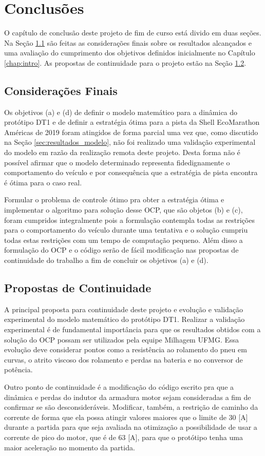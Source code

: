 \chapter{Conclusões}
\label{chap:conclusao}

O capítulo de conclusão deste projeto de fim de curso está divido em duas seções.
Na Seção \ref{sec:5_1} são feitas as considerações finais sobre os resultados alcançados e uma avaliação do cumprimento dos objetivos definidos inicialmente no Capítulo \ref{chap:intro}.
As propostas de continuidade para o projeto estão na Seção \ref{sec:5_2}.

\section{Considerações Finais}
\label{sec:5_1}

Os objetivos (a) e (d) de definir o modelo matemático para a dinâmica do protótipo DT1 e de definir a estratégia ótima para a pista da Shell EcoMarathon Américas de 2019 
foram atingidos de forma parcial uma vez que, como discutido na Seção \ref{sec:resultados_modelo}, não foi realizado uma validação experimental do modelo em razão da 
realização remota deste projeto. Desta forma não é possível afirmar que o modelo determinado representa fidedignamente o comportamento do veículo
e por consequência que a estratégia de pista encontra é ótima para o caso real.

Formular o problema de controle ótimo pra obter a estratégia ótima e implementar o algoritmo para solução desse OCP,
que são objetos (b) e (c), foram cumpridos integralmente pois a formulação contempla todas as restrições para o comportamento do veículo durante uma tentativa e o solução cumpriu todas estas
restrições com um tempo de computação pequeno. Além disso a formulação do OCP e o código serão de fácil modificação nas propostas de continuidade do trabalho
a fim de concluir os objetivos (a) e (d).

\section{Propostas de Continuidade}
\label{sec:5_2}

A principal proposta para continuidade deste projeto e evolução e validação experimental do modelo matemático do protótipo DT1.
Realizar a validação experimental é de fundamental importância para que os resultados obtidos com a solução do OCP possam ser utilizados pela equipe Milhagem UFMG.
Essa evolução deve considerar pontos como a resistência ao rolamento do pneu em curvas, o atrito viscoso dos rolamento e perdas na bateria e no conversor de potência.

Outro ponto de continuidade é a modificação do código escrito pra que a dinâmica e perdas do indutor da armadura motor sejam consideradas a fim de confirmar
se são desconsideráveis.  
Modificar, também, a restrição de caminho da corrente de forma que ela possa atingir valores maiores que o limite de $30$ [A] durante a partida para que 
seja avaliada na otimização a possibilidade de usar a corrente de pico do motor, que é de $63$ [A], para que o protótipo tenha
uma maior aceleração no momento da partida. 

\clearpage
